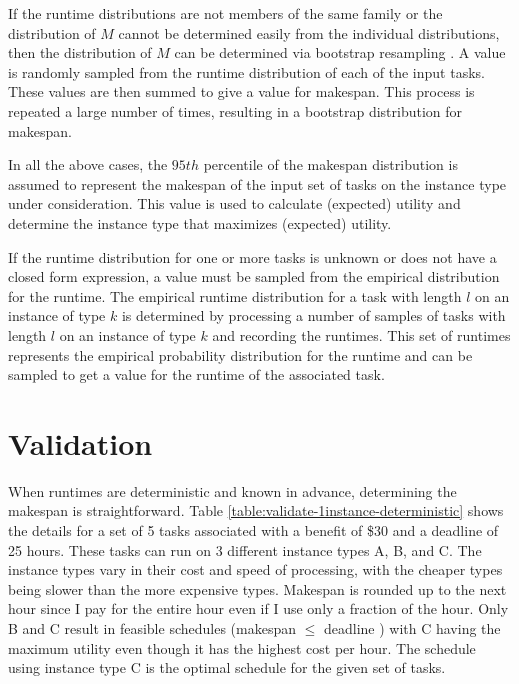 \documentclass[12pt]{report}
\begin{document}
If the runtime distributions are not members of the same family or the distribution of $M$ cannot be determined easily from the individual distributions, then the distribution of $M$ can be determined via bootstrap resampling \cite{Efron1993}.
A value is randomly sampled from the runtime distribution of each of the input tasks.
These values are then summed to give a value for makespan.
This process is repeated a large number of times, resulting in a bootstrap distribution for makespan.

In all the above cases, the $95th$ percentile of the makespan distribution is assumed to represent the makespan of the input set of tasks on the instance type under consideration.
This value is used to calculate (expected) utility and determine the instance type that maximizes (expected) utility.


If the runtime distribution for one or more tasks is unknown or does not have a closed form expression, a value must be sampled from the empirical distribution for the runtime.
The empirical runtime distribution for a task with length $l$ on an instance of type $k$ is determined by processing a number of samples of tasks with length $l$ on an instance of type $k$ and recording the runtimes.
This set of runtimes represents the empirical probability distribution for the runtime and can be sampled to get a value for the runtime of the associated task.

\section{Validation}

\label{validate:runtimes:deterministic}
When runtimes are deterministic and known in advance, determining the makespan is straightforward. 
Table \ref{table:validate-1instance-deterministic} shows the details for a set of 5 tasks associated with a benefit of \$30 and a deadline of 25 hours. 
These tasks can run on 3 different instance types A, B, and C. 
The instance types vary in their cost and speed of processing, with the cheaper types being slower than the more expensive types. 
Makespan is rounded up to the next hour since I pay for the entire hour even if I use only a fraction of the hour. 
Only B and C result in feasible schedules (makespan $\leq$ deadline ) with C having the maximum utility even though it has the highest cost per hour.
The schedule using instance type C is the optimal schedule for the given set of tasks.
\end{document}
